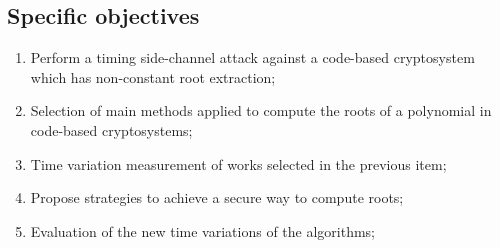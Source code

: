 \subsection{Specific objectives}
\begin{enumerate}[label=\roman*., itemsep=1pt]
    \item Perform a timing side-channel attack against a code-based cryptosystem which has non-constant root extraction;
    \item Selection of main methods applied to compute the roots of a polynomial in code-based cryptosystems;
    \item Time variation measurement of works selected in the previous item;
    \item Propose strategies to achieve a secure way to compute roots;
    \item Evaluation of the new time variations of the algorithms;
\end{enumerate}


